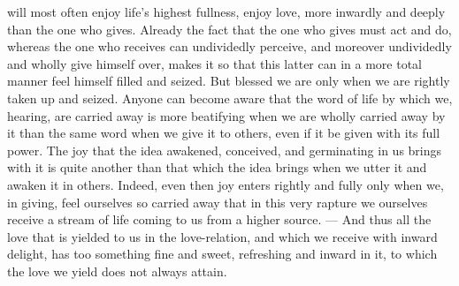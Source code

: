 \documentclass[12pt,a4paper]{book}
\begin{document}
will most often enjoy life's highest fullness, enjoy love, more inwardly
and deeply than the one who gives. Already the fact that the one who gives
must act and do, whereas the one who receives can undividedly perceive, and
moreover undividedly and wholly give himself over, makes it so that this
latter can in a more total manner feel himself filled and seized. But
blessed we are only when we are rightly taken up and seized. Anyone can
become aware that the word of life by which we, hearing, are carried away
is more beatifying when we are wholly carried away by it than the same word
when we give it to others, even if it be given with its full power. The joy
that the idea awakened, conceived, and germinating in us brings with it is
quite another than that which the idea brings when we utter it and awaken
it in others. Indeed, even then joy enters rightly and fully only when we,
in giving, feel ourselves so carried away that in this very rapture we
ourselves receive a stream of life coming to us from a higher source. ---
And thus all the love that is yielded to us in the love-relation, and which
we receive with inward delight, has too something fine and sweet,
refreshing and inward in it, to which the love we yield does not always
attain.
\end{document}
